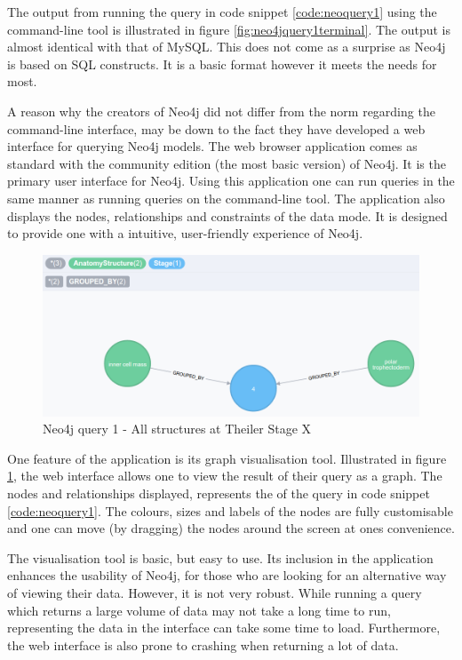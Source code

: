 The output from running the query in code snippet \ref{code:neoquery1} using the command-line tool is illustrated in figure \ref{fig:neo4jquery1terminal}. The output is almost identical with that of MySQL. This does not come as a surprise as Neo4j is based on SQL constructs. It is a basic format however it meets the needs for most.

A reason why the creators of Neo4j did not differ from the norm regarding the command-line interface, may be down to the fact they have developed a web interface for querying Neo4j models. The web browser application comes as standard with the community edition (the most basic version) of Neo4j. It is the primary user interface for Neo4j. Using this application one can run queries in the same manner as running queries on the command-line tool. The application also displays the nodes, relationships and constraints of the data mode. It is designed to provide one with a intuitive, user-friendly experience of Neo4j.

\begin{figure}[H]\begin{center}\includegraphics[width=1\linewidth]{images/neo4jquery1graph}\caption{Neo4j query 1 - All structures at Theiler Stage X}\label{fig:neo4jquery1graph}\end{center}\end{figure}

One feature of the application is its graph visualisation tool. Illustrated in figure \ref{fig:neo4jquery1graph}, the web interface allows one to view the result of their query as a graph. The nodes and relationships displayed, represents the of the query in code snippet \ref{code:neoquery1}. The colours, sizes and labels of the nodes are fully customisable and one can move (by dragging) the nodes around the screen at ones convenience.

The visualisation tool is basic, but easy to use. Its inclusion in the application enhances the usability of Neo4j, for those who are looking for an alternative way of viewing their data. However, it is not very robust. While running a query which returns a large volume of data may not take a long time to run, representing the data in the interface can take some time to load. Furthermore, the web interface is also prone to crashing when returning a lot of data.

